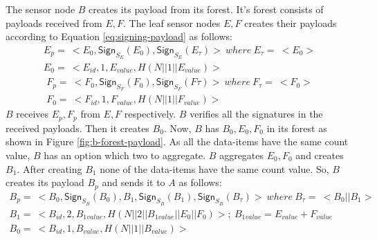 		The sensor node $B$ creates its payload from its forest. 
		It's forest consists of payloads received from $E,F$.
		The leaf sensor nodes $E,F$ creates their payloads according to Equation \ref{eq:signing-payload} as follows:
		\begin{equation}
			\begin{array}{l}
			E_{p} =\ <E_{0}, \textsf{Sign}_{S_{E}}(E_{0}), \textsf{Sign}_{S_{E}}(E_{\tau}) >\ where\ E_{\tau} =\ <E_{0}>\\
			E_{0} =\ <E_{id}, 1, E_{value}, H(N||1||E_{value})>
			\end{array}
		\end{equation}
		\begin{equation}
			\begin{array}{l}
				F_{p} =\ <F_{0}, \textsf{Sign}_{S_{F}}(F_{0}), \textsf{Sign}_{S_{F}}(F{\tau}) >\ where\ F_{\tau} =\ <F_{0}>\\
				F_{0} =\ <F_{id}, 1, F_{value}, H(N||1||F_{value})>
			\end{array}
		\end{equation}
		$B$ receives $E_{p},F_{p}$ from $E,F$ respectively. 
		$B$ verifies all the signatures in the received payloads.
		Then it creates $B_{0}$.
		Now, $B$ has $B_{0},E_{0},F_{0}$ in its forest as shown in Figure \ref{fig:b-forest-payload}. 
		As all the data-items have the same count value, $B$ has an option which two to aggregate.
		$B$ aggregates $E_{0},F_{0}$ and creates $B_{1}$.
		After creating $B_{1}$ none of the data-items have the same count value. 
		So, $B$ creates its payload $B_{p}$ and sends it to $A$ as follows:
		\begin{equation}
			\begin{array}{l}
				B_{p} =\ < B_{0}, \textsf{Sign}_{S_{B}}(B_{0}), B_{1}, \textsf{Sign}_{S_{B}}(B_{1}), \textsf{Sign}_{S_{B}}(B_{\tau}) >\ where\ B_{\tau} =\ <B_{0} || B_{1}>\\
				B_{1} =\ < B_{id}, 2, B_{1value}, H(N||2||B_{1value}||E_{0}||F_{0})>;\ B_{1value} = E_{value} + F_{value} \\
				B_{0} =\ <B_{id}, 1, B_{value}, H(N||1||B_{value})>
			\end{array}
			\label{eq:b-payload}
		\end{equation}

